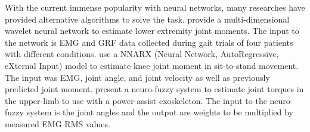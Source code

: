 With the current immense popularity with neural networks, many researches have provided alternative algorithms to solve the task.
\textcite{Ardestani2014} provide a multi-dimensional wavelet neural network to estimate lower extremity joint moments. The input to the network is \ac{EMG} and \ac{GRF} data collected during gait trials of four patients with different conditions. \textcite{Lee14-1} use a NNARX (Neural Network, AutoRegressive, eXternal Input) model to estimate knee joint moment in sit-to-stand movement. The input was \ac{EMG}, joint angle, and joint velocity as well as previously predicted joint moment. \textcite{Kiguchi2012} present a neuro-fuzzy system to estimate joint torques in the upper-limb to use with a power-assist exoskeleton. The input to the neuro-fuzzy system is the joint angles and the output are weights to be multiplied by measured \ac{EMG} RMS values.
